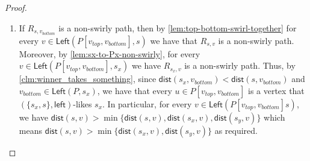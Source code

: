 \documentclass{article}
\newcommand{\Left}{\mathsf{Left}}
\newcommand{\leftside}{\mathsf{left}}
\newcommand{\dist}{\mathsf{dist}}
\begin{document}
\begin{proof}
\begin{enumerate}
        \item If $R_{s,v_{bottom}}$ is a non-swirly path, then by \cref{lem:top-bottom-swirl-together} for every $v\in \Left(P[v_{top},v_{bottom}],s)$ we have that $R_{s,v}$  is a non-swirly path.
        Moreover, by \cref{lem:sx-to-Px-non-swirly}, for every $v\in \Left(P[v_{top},v_{bottom}],s_x)$ we have $R_{s_x,v}$  is a non-swirly path.
        Thus, by \cref{clm:winner_takes_something}, since $\dist(s_x,v_{bottom})<\dist(s,v_{bottom})$ and $v_{bottom}\in\Left(P,s_x)$, we have that every $u\in P[v_{top},v_{bottom}]$ is a vertex that $(\{s_x,s\},\leftside)$-likes $s_x$.
        In particular, for every $v\in \Left(P[v_{top},v_{bottom}]s)$, we have $\dist(s,v)>\min\{\dist(s,v),\dist(s_x,v),\dist(s_y,v)\}$ which means $\dist(s,v)>\min\{\dist(s_x,v),\dist(s_y,v)\}$ as required.\qedhere
    \end{enumerate}
\end{proof}
\end{document}
